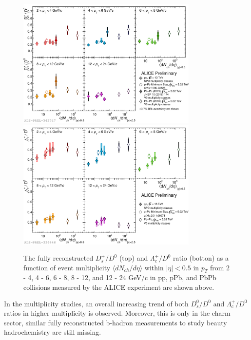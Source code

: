 \begin{figure}[hbtp]
\begin{center}
\includegraphics[width=0.80\textwidth]{Figures/Chapter2/ALICEDsD0Multi.pdf}
\includegraphics[width=0.80\textwidth]{Figures/Chapter2/ALICELambdaD0Multi.pdf}
\caption{The fully reconstructed $D^+_s/D^0$ (top) and $\Lambda_c^+/D^0$ ratio (botton) as a function of event multiplicity $\langle dN_{ch}/d\eta \rangle$ within $|\eta| < 0.5$ in $p_T$ from 2 - 4, 4 - 6, 6 - 8, 8 - 12, and 12 - 24 GeV/c in pp, pPb, and PbPb collisions measured by the ALICE experiment are shown above.}
\label{ALICEMulti}
\end{center}
\end{figure}   



In the multiplicity studies, an overall increasing trend of both $D^0_s/D^0$ and $\Lambda_c^+/D^0$ ratios in higher multiplicity is observed. Moreover, this is only in the charm sector, similar fully reconstructed b-hadron measurements to study beauty hadrochemistry are still missing. 


